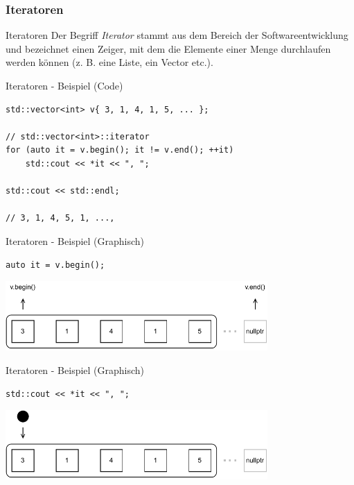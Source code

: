 \subsubsection{Iteratoren}

\begin{frame}{Iteratoren}
    Der Begriff \emph{Iterator} stammt aus dem Bereich der Softwareentwicklung und bezeichnet einen Zeiger, mit dem die Elemente einer Menge durchlaufen werden können (z. B. eine Liste, ein Vector etc.).
\end{frame}

\begin{frame}[fragile]{Iteratoren - Beispiel (Code)}
    \begin{verbatim}
std::vector<int> v{ 3, 1, 4, 1, 5, ... };

// std::vector<int>::iterator
for (auto it = v.begin(); it != v.end(); ++it)
    std::cout << *it << ", ";

std::cout << std::endl;

// 3, 1, 4, 5, 1, ...,
    \end{verbatim}
\end{frame}

\begin{frame}[fragile]{Iteratoren - Beispiel (Graphisch)}
    \begin{verbatim}
auto it = v.begin();
    \end{verbatim}

    \begin{center}
        \includegraphics[width=0.75\textwidth]{pictures/iterators_example_1.pdf}
    \end{center}
\end{frame}

\begin{frame}[fragile]{Iteratoren - Beispiel (Graphisch)}
    \begin{verbatim}
std::cout << *it << ", ";
    \end{verbatim}

    \begin{center}
        \includegraphics[width=0.75\textwidth]{pictures/iterators_example_2.pdf}
    \end{center}
\end{frame}

